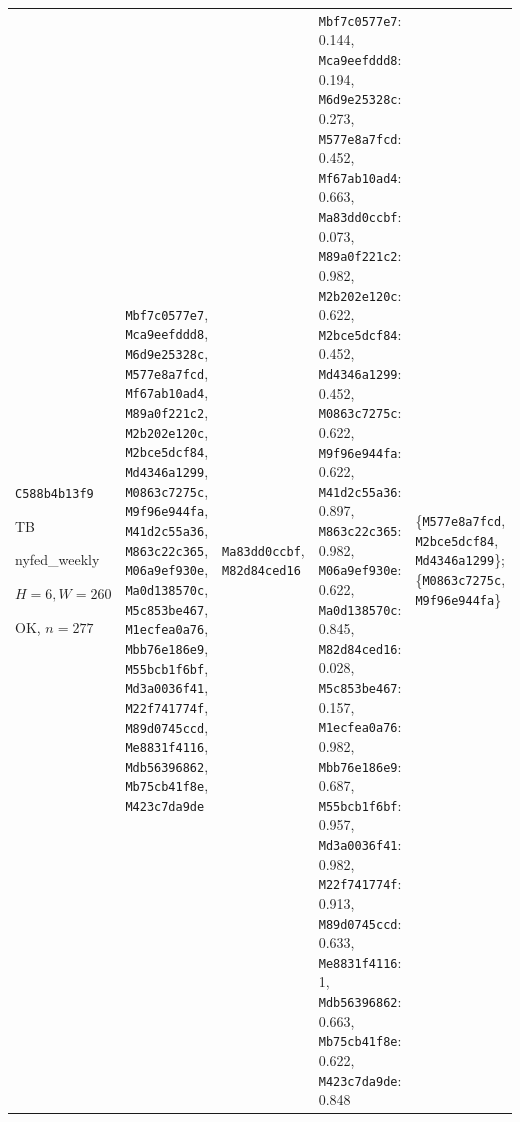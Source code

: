 \begin{longtable}{p{.15\linewidth}p{.17\linewidth}p{.17\linewidth}p{.25\linewidth}p{.14\linewidth}}
\texttt{C588b4b13f9}\par TB\par nyfed\_\allowbreak{}weekly\par $H=6,W=260$\par OK, $n=277$ & \texttt{Mbf7c0577e7}, \texttt{Mca9eefddd8}, \texttt{M6d9e25328c}, \texttt{M577e8a7fcd}, \texttt{Mf67ab10ad4}, \texttt{M89a0f221c2}, \texttt{M2b202e120c}, \texttt{M2bce5dcf84}, \texttt{Md4346a1299}, \texttt{M0863c7275c}, \texttt{M9f96e944fa}, \texttt{M41d2c55a36}, \texttt{M863c22c365}, \texttt{M06a9ef930e}, \texttt{Ma0d138570c}, \texttt{M5c853be467}, \texttt{M1ecfea0a76}, \texttt{Mbb76e186e9}, \texttt{M55bcb1f6bf}, \texttt{Md3a0036f41}, \texttt{M22f741774f}, \texttt{M89d0745ccd}, \texttt{Me8831f4116}, \texttt{Mdb56396862}, \texttt{Mb75cb41f8e}, \texttt{M423c7da9de} & \texttt{Ma83dd0ccbf}, \texttt{M82d84ced16} & \texttt{Mbf7c0577e7}: 0.144, \texttt{Mca9eefddd8}: 0.194, \texttt{M6d9e25328c}: 0.273, \texttt{M577e8a7fcd}: 0.452, \texttt{Mf67ab10ad4}: 0.663, \texttt{Ma83dd0ccbf}: 0.073, \texttt{M89a0f221c2}: 0.982, \texttt{M2b202e120c}: 0.622, \texttt{M2bce5dcf84}: 0.452, \texttt{Md4346a1299}: 0.452, \texttt{M0863c7275c}: 0.622, \texttt{M9f96e944fa}: 0.622, \texttt{M41d2c55a36}: 0.897, \texttt{M863c22c365}: 0.982, \texttt{M06a9ef930e}: 0.622, \texttt{Ma0d138570c}: 0.845, \texttt{M82d84ced16}: 0.028, \texttt{M5c853be467}: 0.157, \texttt{M1ecfea0a76}: 0.982, \texttt{Mbb76e186e9}: 0.687, \texttt{M55bcb1f6bf}: 0.957, \texttt{Md3a0036f41}: 0.982, \texttt{M22f741774f}: 0.913, \texttt{M89d0745ccd}: 0.633, \texttt{Me8831f4116}: 1, \texttt{Mdb56396862}: 0.663, \texttt{Mb75cb41f8e}: 0.622, \texttt{M423c7da9de}: 0.848 & \{\texttt{M577e8a7fcd}, \texttt{M2bce5dcf84}, \texttt{Md4346a1299}\}; \{\texttt{M0863c7275c}, \texttt{M9f96e944fa}\} \\

\end{longtable}
